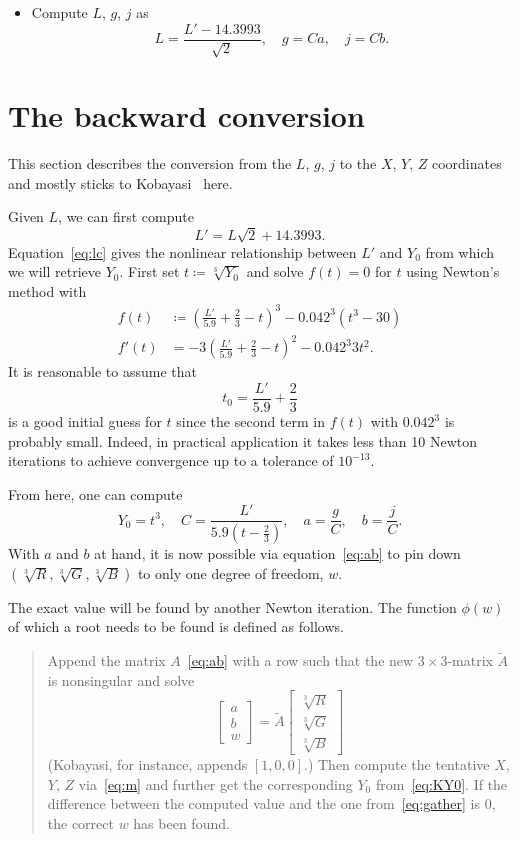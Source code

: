 \documentclass{scrartcl}
\theoremstyle{named}
\begin{document}
\begin{itemize}
  \item Compute $L$, $g$, $j$ as
    \[
      L = \frac{L' - 14.3993}{\sqrt{2}},\quad g = Ca,\quad j = Cb.
    \]
\end{itemize}

\section{The backward conversion}

This section describes the conversion from the  $L$, $g$, $j$ to the $X$, $Y$, $Z$
coordinates and mostly sticks to Kobayasi~\cite{kobayasi} here.

Given $L$, we can first compute
\[
  L' = L \sqrt{2} + 14.3993.
\]
Equation~\eqref{eq:lc} gives the nonlinear relationship between $L'$ and $Y_0$ from
which we will retrieve $Y_0$. First set $t\coloneqq \sqrt[3]{Y_0}$ and solve $f(t)=0$
for $t$ using Newton's method with
\[
  \begin{split}
    f(t) &\coloneqq {\left(\frac{L'}{5.9} + \frac{2}{3} - t\right)}^3 - 0.042^3 (t^3 - 30)\\
    f'(t) &= -3 {\left(\frac{L'}{5.9} + \frac{2}{3} - t\right)}^2 - 0.042^3 3 t^2.
  \end{split}
\]
It is reasonable to assume that
\[
  t_0 = \frac{L'}{5.9} + \frac{2}{3}
\]
is a good initial guess for $t$ since the second term in $f(t)$ with $0.042^3$ is
probably small.
Indeed, in practical application it takes less than 10 Newton iterations to achieve
convergence up to a tolerance of $10^{-13}$.

From here, one can compute
\begin{equation}\label{eq:gather}
  Y_0 = t^3,\quad
  C = \frac{L'}{5.9 \left(t - \frac{2}{3}\right)},\quad
  a = \frac{g}{C},\quad
  b = \frac{j}{C}.
\end{equation}
With $a$ and $b$ at hand, it is now possible via equation~\eqref{eq:ab} to pin down
$(\sqrt[3]{R}, \sqrt[3]{G}, \sqrt[3]{B})$ to only one degree of freedom, $w$.

The exact value will be found by another Newton iteration. The function $\phi(w)$
of which a root needs to be found is defined as follows.
\begin{quotation}
  Append the matrix $A$~\eqref{eq:ab} with a row such that the new $3\times3$-matrix
  $\tilde{A}$ is nonsingular and solve
  \[
    \begin{bmatrix}
      a\\
      b\\
      w
    \end{bmatrix}
    =
    \tilde{A}
    \begin{bmatrix}
      \sqrt[3]{R}\\
      \sqrt[3]{G}\\
      \sqrt[3]{B}
    \end{bmatrix}
  \]
  (Kobayasi, for instance, appends $[1, 0, 0]$.) Then compute the tentative $X$, $Y$,
  $Z$ via~\eqref{eq:m} and further get the corresponding $Y_0$ from~\eqref{eq:KY0}. If
  the difference between the computed value and the one from~\eqref{eq:gather} is 0, the
  correct $w$ has been found.
\end{quotation}
\end{document}
